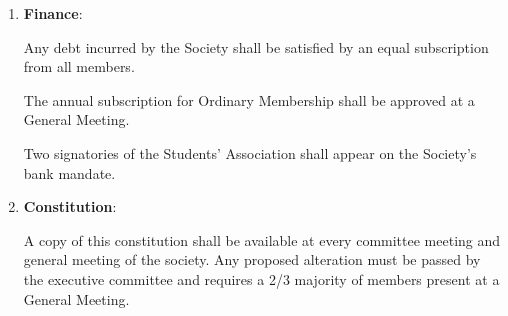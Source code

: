 \documentclass[11pt]{article}
\begin{document}
\begin{enumerate}[label = \Roman*.]
\item \textbf{Finance}:

Any debt incurred by the Society shall be satisfied by an equal subscription from all members.

The annual subscription for Ordinary Membership shall be approved at a General Meeting.

Two signatories of the Students' Association shall appear on the Society's bank mandate.

\item \textbf{Constitution}: 

A copy of this constitution shall be available at every committee meeting and general meeting of the society. Any proposed alteration must be passed by the executive committee and requires a 2/3 majority of members present at a General Meeting. 

\end{enumerate}
\end{document}
